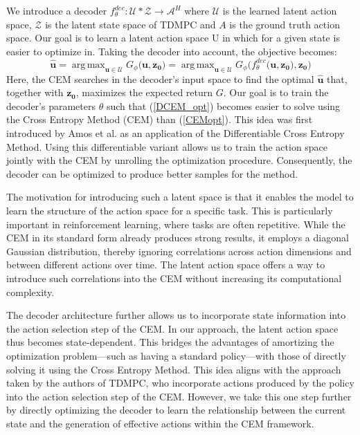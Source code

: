 \documentclass{article}
\DeclareMathOperator*{\argmax}{arg\,max}
\begin{document}
We introduce a decoder $f_\theta^{dec}: \mathcal{U}*\mathcal{Z}\xrightarrow{}\mathcal{A}^H$ where $\mathcal{U}$ is the learned latent action space, $\mathcal{Z}$ is the latent state space of TDMPC and $A$ is the ground truth action space. Our goal is to learn a latent action space U in which for a given state is easier to optimize in. 
Taking the decoder into account, the objective becomes:
\begin{equation}\label{DCEM_opt}
\mathbf{\hat{u}} = 
\argmax_{\mathbf{u}\in\mathcal{U}}G_\phi(\mathbf{u,z_0)}=\argmax_{\mathbf{u}\in\mathcal{U}}G_\phi(f_\theta^{dec}(\mathbf{u,z_0),z_0)}
\end{equation}
Here, the CEM searches in the decoder’s input space to find the optimal $\mathbf{\hat{u}}$ that, together with ${\mathbf{z_0}}$, maximizes the expected return $G$. Our goal is to train the decoder’s parameters $\theta$ such that (\ref{DCEM_opt}) becomes easier to solve using the Cross Entropy Method (CEM) than (\ref{CEMopt}). This idea was first introduced by Amos et al. as an application of the Differentiable Cross Entropy Method. Using this differentiable variant allows us to train the action space jointly with the CEM by unrolling the optimization procedure. Consequently, the decoder can be optimized to produce better samples for the method.

The motivation for introducing such a latent space is that it enables the model to learn the structure of the action space for a specific task. This is particularly important in reinforcement learning, where tasks are often repetitive. While the CEM in its standard form already produces strong results, it employs a diagonal Gaussian distribution, thereby ignoring correlations across action dimensions and between different actions over time. The latent action space offers a way to introduce such correlations into the CEM without increasing its computational complexity.

The decoder architecture further allows us to incorporate state information into the action selection step of the CEM. In our approach, the latent action space thus becomes state-dependent. This bridges the advantages of amortizing the optimization problem—such as having a standard policy—with those of directly solving it using the Cross Entropy Method. This idea aligns with the approach taken by the authors of TDMPC, who incorporate actions produced by the policy into the action selection step of the CEM. However, we take this one step further by directly optimizing the decoder to learn the relationship between the current state and the generation of effective actions within the CEM framework.
\end{document}
